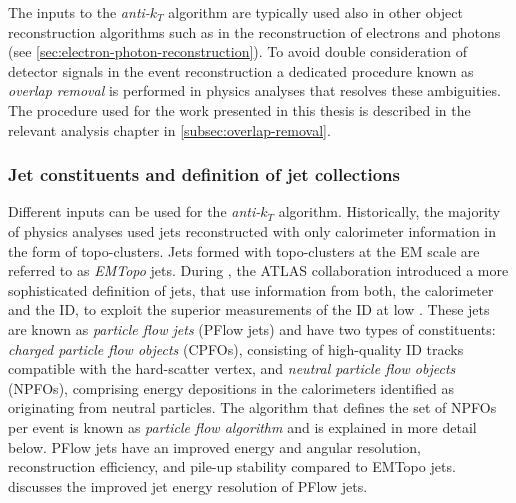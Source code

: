The inputs to the \emph{anti-$k_T$} algorithm are typically used also in other object reconstruction algorithms such as in the reconstruction of electrons and photons (see \cref{sec:electron-photon-reconstruction}).
To avoid double consideration of detector signals in the event reconstruction a dedicated procedure known as \emph{overlap removal} is performed in physics analyses that resolves these ambiguities. The procedure used for the work presented in this thesis is described in the relevant analysis chapter in \cref{subsec:overlap-removal}.


\subsubsection{Jet constituents and definition of jet collections}
Different inputs can be used for the \emph{anti-$k_T$} algorithm.
Historically, the majority of physics analyses used jets reconstructed with only calorimeter information in the form of topo-clusters. Jets formed with topo-clusters at the EM scale are referred to as \emph{EMTopo} jets.
During \RunTwo, the ATLAS collaboration introduced a more sophisticated definition of jets, that use information from both, the calorimeter and the ID, to exploit the superior measurements of the ID at low \pT.
These jets are known as \emph{particle flow jets} (PFlow jets) and have two types of constituents: \emph{charged particle flow objects} (CPFOs), consisting of high-quality ID tracks compatible with the hard-scatter vertex, and \emph{neutral particle flow objects} (NPFOs), comprising energy depositions in the calorimeters identified as originating from neutral particles. The algorithm that defines the set of NPFOs per event is known as \emph{particle flow algorithm} and is explained in more detail below.
PFlow jets have an improved energy and angular resolution, reconstruction efficiency, and pile-up stability compared to EMTopo jets\cite{PERF-2015-09}.
 discusses the improved jet energy resolution of PFlow jets.

